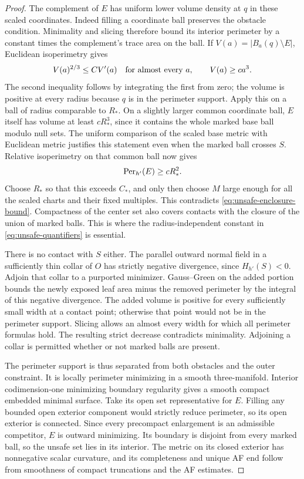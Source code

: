 \begin{proof}
The complement of \(E\) has uniform lower volume density at
\(q\) in these scaled coordinates.  Indeed filling a coordinate
ball preserves the obstacle condition.  Minimality and slicing
therefore bound its interior perimeter by a constant times the
complement's trace area on the ball.  If
\(V(a)=|B_a(q)\setminus E|\), Euclidean isoperimetry gives
\begin{equation}
 V(a)^{2/3}\le C V'(a)
 \quad\hbox{for almost every }a,\qquad
 V(a)\ge ca^3.
 \label{eq:unsafe-complement-density}
\end{equation}
The second inequality follows by integrating the first from zero;
the volume is positive at every radius because \(q\) is in
the perimeter support.  Apply this on a ball of radius comparable
to \(R_*\).  On a slightly larger common coordinate ball,
\(E\) itself has volume at least \(cR_*^3\), since it contains
the whole marked base ball modulo null sets.  The uniform
comparison of the scaled base metric with Euclidean metric
justifies this statement even when the marked ball crosses
\(S\).  Relative isoperimetry on that common ball now gives
\begin{equation}
 \operatorname{Per}_{h'}(E)\ge cR_*^2.
 \label{eq:unsafe-obstacle-perimeter}
\end{equation}
Choose \(R_*\) so that this exceeds \(C_*\), and only then
choose \(M\) large enough for all the scaled charts and their
fixed multiples.  This contradicts
\eqref{eq:unsafe-enclosure-bound}.  Compactness of the center set
also covers contacts with the closure of the union of marked balls.
This is where the radius-independent constant in
\eqref{eq:unsafe-quantifiers} is essential.

There is no contact with \(S\) either.  The parallel outward
normal field in a sufficiently thin collar of \(O\) has strictly
negative divergence, since \(H_{h'}(S)<0\).  Adjoin that collar
to a purported minimizer.  Gauss--Green on the added portion
bounds the newly exposed leaf area minus the removed perimeter
by the integral of this negative divergence.  The added volume
is positive for every sufficiently small width at a contact
point; otherwise that point would not be in the perimeter
support.  Slicing allows an almost every width for which all
perimeter formulas hold.  The resulting strict decrease
contradicts minimality.  Adjoining a collar is permitted whether
or not marked balls are present.

The perimeter support is thus separated from both obstacles and
the outer constraint.  It is locally perimeter minimizing in a
smooth three-manifold.  Interior codimension-one minimizing
boundary regularity gives a smooth compact embedded minimal
surface.  Take its open set representative for \(E\).  Filling
any bounded open exterior component would strictly reduce
perimeter, so its open exterior is connected.  Since every
precompact enlargement is an admissible competitor, \(E\) is
outward minimizing.  Its boundary is disjoint from every marked
ball, so the unsafe set lies in its interior.  The metric on
its closed exterior has nonnegative scalar curvature, and its
completeness and unique AF end follow from smoothness of compact
truncations and the AF estimates.


\end{proof}
